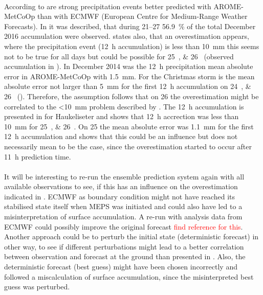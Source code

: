\\
According to \citet{muller_arome-metcoop:_2017} are strong precipitation events better predicted with AROME-MetCoOp than with ECMWF (European Centre for Medium-Range Weather Forecasts). In  it was described, that during \SIrange{21}{27}{\dec} \SI{56.9}{\percent} of the total December 2016 accumulation were observed. \citet{muller_arome-metcoop:_2017} states also, that an overestimation appears, where the precipitation event (\SI{12}{\hour} accumulation) is less than \SI{10}{\mm} this seems not to be true for all days but could be possible for \SIlist{25;26}{\dec} (observed accumulation in ). In December 2014 was the \SI{12}{\hour} precipitation mean absolute error in AROME-MetCoOp with \SI{1.5}{\mm}. For the Christmas storm is the mean absolute error not larger than \SI{5}{\mm} for the first \SI{12}{\hour} accumulation on \SIlist{24;26}{\dec} (). Therefore, the assumption follows that on \SI{26}{\dec} the overestimation might be correlated to the <\SI{10}{\mm} problem described by \citet{muller_arome-metcoop:_2017}. The \SI{12}{\hour} accumulation is presented in  for Haukeliseter and shows that \SI{12}{\hour} accrection was less than \SI{10}{\mm} for \SIlist{25;26}{\dec}.
On \SI{25}{\dec} the mean absolute error was \SI{1.1}{\mm} for the first \SI{12}{\hour} accumulation and shows that this could be an influence but does not necessarily mean to be the case, since the overestimation started to occur after \SI{11}{\hour} prediction time. 
\\
\\
It will be interesting to re-run the ensemble prediction system again with all available observations to see, if this has an influence on the overestimation indicated in . ECMWF as boundary condition might not have reached its stabilised state itself when MEPS was initiated and could also have led to a misinterpretation of surface accumulation. A re-run with analysis data from ECMWF could possibly improve the original forecast \textcolor{red}{find reference for this}. 
Another approach could be to perturb the initial state (deterministic forecast) in other way, to see if different perturbations might lead to a better correlation between observation and forecast at the ground than presented in . Also, the deterministic forecast (best guess) might have been chosen incorrectly and followed a miscalculation of surface accumulation, since the misinterpreted best guess was perturbed.
